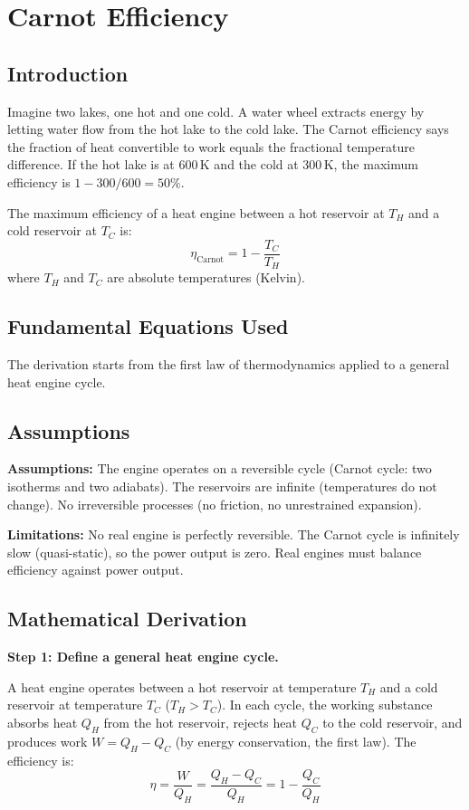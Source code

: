 \chapter{Carnot Efficiency}

\section*{Introduction}

Imagine two lakes, one hot and one cold. A water wheel extracts energy by letting water flow from the hot lake to the cold lake. The Carnot efficiency says the fraction of heat convertible to work equals the fractional temperature difference. If the hot lake is at 600\,K and the cold at 300\,K, the maximum efficiency is $1 - 300/600 = 50\%$.


The maximum efficiency of a heat engine between a hot reservoir at $T_H$ and a cold reservoir at $T_C$ is:
\[
\eta_{\text{Carnot}} = 1 - \frac{T_C}{T_H}
\]
where $T_H$ and $T_C$ are absolute temperatures (Kelvin).

\section*{Fundamental Equations Used}

The derivation starts from the first law of thermodynamics applied to a general heat engine cycle.

\section*{Assumptions}

\textbf{Assumptions:} The engine operates on a reversible cycle (Carnot cycle: two isotherms and two adiabats). The reservoirs are infinite (temperatures do not change). No irreversible processes (no friction, no unrestrained expansion).


\textbf{Limitations:} No real engine is perfectly reversible. The Carnot cycle is infinitely slow (quasi-static), so the power output is zero. Real engines must balance efficiency against power output.


\section*{Mathematical Derivation}

\textbf{Step 1: Define a general heat engine cycle.}

A heat engine operates between a hot reservoir at temperature $T_H$ and a cold reservoir at temperature $T_C$ ($T_H > T_C$). In each cycle, the working substance absorbs heat $Q_H$ from the hot reservoir, rejects heat $Q_C$ to the cold reservoir, and produces work $W = Q_H - Q_C$ (by energy conservation, the first law). The efficiency is:
\begin{equation}
\eta = \frac{W}{Q_H} = \frac{Q_H - Q_C}{Q_H} = 1 - \frac{Q_C}{Q_H}
\end{equation}

